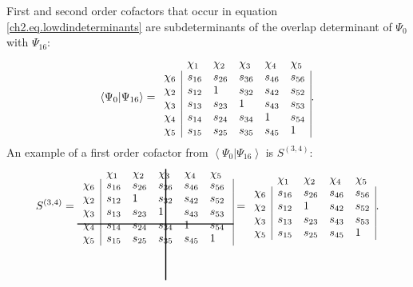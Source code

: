 First and second order cofactors that occur in equation \ref{ch2.eq.lowdindeterminants} are subdeterminants of the overlap determinant of $\Psi_0$ with $\Psi_{16}$:
\begin{equation}
\left < \Psi_0 | \Psi_{16} \right> =
\begin{array}{llllll}
 &  \chi_1 & \chi_2 & \chi_3 & \chi_4 & \chi_5 \\
 \chi_6 & \multicolumn{1}{|l}{ s_{16} } & s_{26} & s_{36} & s_{46} & \multicolumn{1}{l|}{ s_{56} } \\
 \chi_2 & \multicolumn{1}{|l}{ s_{12} } & 1 & s_{32} & s_{42} & \multicolumn{1}{l|}{ s_{52} } \\
 \chi_3 & \multicolumn{1}{|l}{ s_{13} } & s_{23} & 1 & s_{43} & \multicolumn{1}{l|}{ s_{53} } \\
 \chi_4 & \multicolumn{1}{|l}{ s_{14} } & s_{24} & s_{34} & 1 & \multicolumn{1}{l|}{ s_{54} } \\
 \chi_5 & \multicolumn{1}{|l}{ s_{15} } & s_{25} & s_{35} & s_{45} & \multicolumn{1}{l|}{ 1 }
\end{array}.
\label{ch2.eq.s016g}
\end{equation}
An example of a first order cofactor from $\left < \Psi_0 | \Psi_{16} \right>$ is $S^{(3,4)}$:
\begin{equation}
S^{(3,4)}=
\begin{array}{llllll}
 & \hskip 53.0 pt \hbox{\lower 93pt\hbox{\vrule height100pt width 1.0pt}}\hskip-54.0pt \chi_1 & \chi_2 & \chi_3 & \chi_4 & \chi_5 \\
 \noalign{\vskip-91pt}
 \chi_6 & \multicolumn{1}{|l}{ s_{16} } & s_{26} & s_{36} & s_{46} & \multicolumn{1}{l|}{ s_{56} } \\
 \chi_2 & \multicolumn{1}{|l}{ s_{12} } & 1 & s_{32} & s_{42} & \multicolumn{1}{l|}{ s_{52} } \\
 \chi_3 & \multicolumn{1}{|l}{ s_{13} } & s_{23} & 1 & s_{43} & \multicolumn{1}{l|}{ s_{53} } \\
 \chi_4 & \multicolumn{1}{|l}{ s_{14} } & s_{24} & s_{34} & 1 & \multicolumn{1}{l|}{ s_{54} } \\
 \noalign{\vskip-8pt}
 \multispan6\hbox{\vrule  height 1.0 pt width140pt}\cr
 \noalign{\vskip 7pt}
 \chi_5 & \multicolumn{1}{|l}{ s_{15} } & s_{25} & s_{35} & s_{45} & \multicolumn{1}{l|}{ 1 }
\end{array} =
\begin{array}{lllll}
 &  \chi_1 & \chi_2 & \chi_4 & \chi_5 \\
 \chi_6 & \multicolumn{1}{|l}{ s_{16} } & s_{26} & s_{46} & \multicolumn{1}{l|}{ s_{56} } \\
 \chi_2 & \multicolumn{1}{|l}{ s_{12} } & 1 & s_{42} & \multicolumn{1}{l|}{ s_{52} } \\
 \chi_3 & \multicolumn{1}{|l}{ s_{13} } & s_{23} & s_{43} & \multicolumn{1}{l|}{s_{53}} \\
 \chi_5 & \multicolumn{1}{|l}{ s_{15} } & s_{25} & s_{45} & \multicolumn{1}{l|}{1}
\end{array}.
\label{ch2.eq.s16g}
\end{equation}

